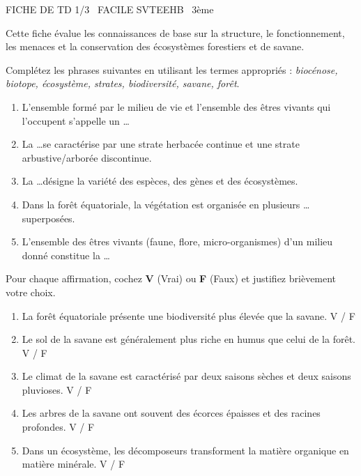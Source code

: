 \documentclass[11pt]{article}
\begin{document}
\begin{tcolorbox}[enhanced,colback=popink,colframe=popink,arc=10pt,boxrule=0pt,left=12pt,right=12pt,top=9pt,bottom=9pt]
{\color{white}\popxbold\small FICHE DE TD 1/3 \textbullet\ FACILE \hfill SVTEEHB \textbullet\ 3ème\par}
\end{tcolorbox}
\vspace{4pt}
Cette fiche évalue les connaissances de base sur la structure, le fonctionnement, les menaces et la conservation des écosystèmes forestiers et de savane.

\begin{exercice}
Complétez les phrases suivantes en utilisant les termes appropriés : \textit{biocénose, biotope, écosystème, strates, biodiversité, savane, forêt}.
\begin{enumerate}
    \item L'ensemble formé par le milieu de vie et l'ensemble des êtres vivants qui l'occupent s'appelle un \ldots
    \item La \ldots se caractérise par une strate herbacée continue et une strate arbustive/arborée discontinue.
    \item La \ldots désigne la variété des espèces, des gènes et des écosystèmes.
    \item Dans la forêt équatoriale, la végétation est organisée en plusieurs \ldots superposées.
    \item L'ensemble des êtres vivants (faune, flore, micro-organismes) d'un milieu donné constitue la \ldots
\end{enumerate}
\end{exercice}

\begin{exercice}
Pour chaque affirmation, cochez \textbf{V} (Vrai) ou \textbf{F} (Faux) et justifiez brièvement votre choix.
\begin{enumerate}
    \item La forêt équatoriale présente une biodiversité plus élevée que la savane. \hfill V / F
    \item Le sol de la savane est généralement plus riche en humus que celui de la forêt. \hfill V / F
    \item Le climat de la savane est caractérisé par deux saisons sèches et deux saisons pluvioses. \hfill V / F
    \item Les arbres de la savane ont souvent des écorces épaisses et des racines profondes. \hfill V / F
    \item Dans un écosystème, les décomposeurs transforment la matière organique en matière minérale. \hfill V / F
\end{enumerate}
\end{exercice}
\end{document}

